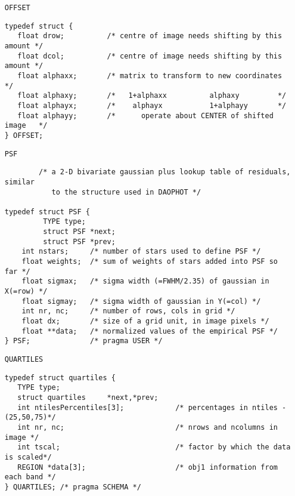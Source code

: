 {\begin{itemize}
\begin{verbatim}
/*
 * parameters found (or used) by Measure Objects
 */
   float allCounts;          /* sum all counts from all (color) object pixels*/
   float allCErr;            /* estimated uncert in 'allCounts' */
   float texture;            /* measure of object texture/galaxy type */
   long flags;               /* flags used by Measure Objects code only */
} OBJECT1;
\end{verbatim}

\item[{\tt OFFSET}]

\begin{verbatim}
typedef struct {
   float drow;          /* centre of image needs shifting by this amount */
   float dcol;          /* centre of image needs shifting by this amount */
   float alphaxx;       /* matrix to transform to new coordinates */
   float alphaxy;       /*   1+alphaxx          alphaxy         */
   float alphayx;       /*    alphayx           1+alphayy       */
   float alphayy;       /*      operate about CENTER of shifted image   */
} OFFSET;
\end{verbatim}

\item[{\tt PSF}]

\begin{verbatim}
        /* a 2-D bivariate gaussian plus lookup table of residuals, similar
           to the structure used in DAOPHOT */

typedef struct PSF {
         TYPE type;
         struct PSF *next;
         struct PSF *prev;
    int nstars;     /* number of stars used to define PSF */
    float weights;  /* sum of weights of stars added into PSF so far */
    float sigmax;   /* sigma width (=FWHM/2.35) of gaussian in X(=row) */
    float sigmay;   /* sigma width of gaussian in Y(=col) */
    int nr, nc;     /* number of rows, cols in grid */
    float dx;       /* size of a grid unit, in image pixels */
    float **data;   /* normalized values of the empirical PSF */
} PSF;              /* pragma USER */
\end{verbatim}

\item[{\tt QUARTILES}]

\begin{verbatim}
typedef struct quartiles {
   TYPE type;
   struct quartiles     *next,*prev;
   int ntilesPercentiles[3];            /* percentages in ntiles - (25,50,75)*/
   int nr, nc;                          /* nrows and ncolumns in image */
   int tscal;                           /* factor by which the data is scaled*/
   REGION *data[3];                     /* obj1 information from each band */
} QUARTILES; /* pragma SCHEMA */
\end{verbatim}


\end{itemize}}
